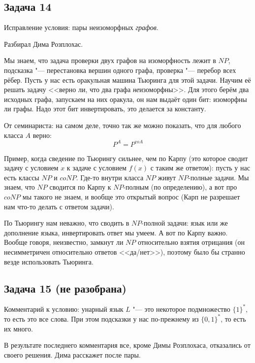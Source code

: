 \subsection{Задача 14}
	Исправление условия: пары неизоморфных \textit{графов}.

	Разбирал Дима Розплохас.

	Мы знаем, что задача проверки двух графов на изоморфность лежит в $NP$,
	подсказка "--- перестановка вершин одного графа, проверка "--- перебор всех рёбер.
	Пусть у нас есть оракульная машина Тьюринга для этой задачи.
	Научим её решать задачу <<верно ли, что два графа \textit{не}изоморфны>>.
	Для этого берём два исходных графа, запускаем на них оракула, он нам выдаёт
	один бит: изоморфны ли графы.
	Надо этот бит инвертировать, это делается за константу.

	\begin{Rem}
		От семинариста: на самом деле, точно так же можно показать, что для любого
		класса $A$ верно:
		\[ P^A = P^{coA} \]
	\end{Rem}
	\begin{Rem}\label{task_14_rem_turing}
		Пример, когда сведение по Тьюрингу сильнее, чем по Карпу (это которое сводит задачу
		с условием $x$ к задаче с условием $f(x)$ с таким же ответом):
		пусть у нас есть классы $NP$ и $coNP$.
		Где-то внутри класса $NP$ живут $NP$-полные задачи.
		Мы знаем, что $NP$ сводится по Карпу к $NP$-полным (по определению),
		а вот про $coNP$ мы такого не знаем, и вообще это открытый вопрос (Карп не разрешает нам что-то делать
		с ответом задачи).

		По Тьюрингу нам неважно, что сводить в $NP$-полной задачи: язык или же дополнение языка,
		инвертировать ответ мы умеем.
		А вот по Карпу важно.
		Вообще говоря, неизвестно, замкнут ли $NP$ относительно взятия отрицания (он несимметричен относительно
		ответов <<да/нет>>), поэтому было бы странно везде использовать Тьюринга.
	\end{Rem}

\subsection{Задача 15 (не разобрана)}
	Комментарий к условию: унарный язык $L$ "--- это некоторое подмножество $\{1\}^*$,
	то есть это все слова.
	При этом подсказки у нас по-прежнему из $\{0,1\}^*$, то есть их много.

	В результате последнего комментария все, кроме Димы Розплохаса, отказались от своего решения.
	Дима расскажет после пары.

